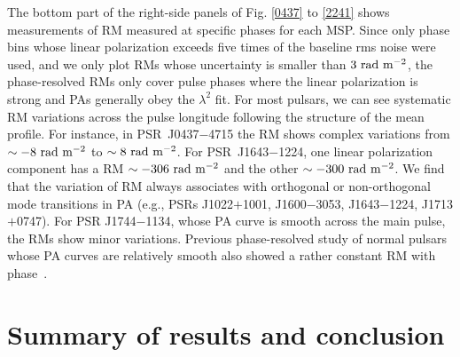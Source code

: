 \documentclass[useAMS,usenatbib]{mn2e}
\begin{document}

The bottom part of the right-side panels of Fig. \ref{0437} to \ref{2241} shows measurements of RM measured at specific phases for each MSP.
%
Since only phase bins whose linear polarization exceeds five times of the baseline 
rms noise were used, and we only plot RMs whose uncertainty is smaller than $3\ \rm{rad\ m^{-2}}$,
the phase-resolved RMs only cover pulse phases where the linear polarization is 
strong and PAs generally obey the $\lambda^2$ fit.
%
For most pulsars, we can see systematic RM variations across the pulse longitude following the 
structure of the mean profile.
%
For instance, in PSR~J0437$-$4715 the RM shows complex variations from $\sim -8\ \rm{rad\ m^{-2}}$ 
to $\sim 8\ \rm{rad\ m^{-2}}$. For PSR~J1643$-$1224, one linear polarization component has 
a RM $\sim -306\ \rm{rad\ m^{-2}}$ and the other $\sim -300\ \rm{rad\ m^{-2}}$. 
%
We find that the variation of RM always associates with orthogonal or non-orthogonal mode 
transitions in PA (e.g., PSRs J1022$+$1001, J1600$-$3053, J1643$-$1224, J1713$+$0747).
%
For PSR J1744$-$1134, whose PA curve is smooth across the main pulse, the RMs show minor 
variations.
%
Previous phase-resolved study of normal pulsars whose PA curves are relatively smooth also 
showed a rather constant RM with phase~\citep{Noutsos09}.

\section{Summary of results and conclusion}
\end{document}
